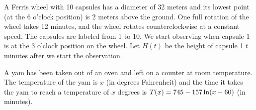 \documentclass[11pt,answers]{exam}
\let\originalleft\left
\let\originalright\right
\renewcommand{\left}{\mathopen{}\mathclose\bgroup\originalleft}
\renewcommand{\right}{\aftergroup\egroup\originalright}
\begin{document}
\begin{questions}
\begin{parts}
\end{parts}

\question A Ferris wheel with 10 capsules has a diameter of 32 meters and its lowest point (at the 6 o'clock position) is 2 meters above the ground. One full rotation of the wheel takes 12 minutes, and the wheel rotates counterclockwise at a constant speed. The capsules are labeled from 1 to 10. We start observing when capsule 1 is at the 3 o'clock position on the wheel. 
 Let $H(t)$ be the height of capsule 1 $t$ minutes after we start the observation. 
\question 	A yam has been taken out of an oven and left on a counter at room temperature. The temperature of the yam is $x$ (in degrees Fahrenheit) and the time it takes the yam to reach a temperature of $x$ degrees is $\displaystyle T(x)=745-157\ln\left ( x-60 \right)$ (in minutes). 
	\begin{parts}

\end{parts}
\end{questions}
\end{document}
